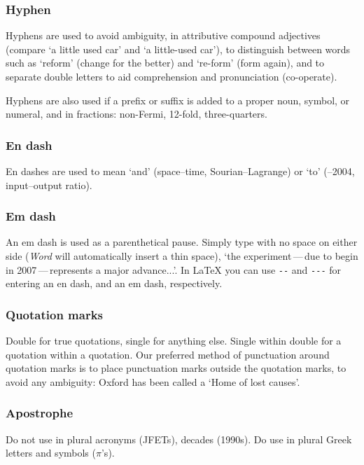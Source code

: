 \documentclass{cernrep}
\begin{document}
\subsubsection{Hyphen}

Hyphens are used to avoid ambiguity, \ie in attributive compound
adjectives (compare `a little used car' and `a little-used car'), to
distinguish between words such as `reform' (change for the better) and
`re-form' (form again), and to separate double letters to aid
comprehension and pronunciation (\eg co-operate).

Hyphens are also used if a prefix or suffix is added to a proper noun,
symbol, or numeral, and in fractions: \eg non-Fermi, 12-fold,
three-quarters.

\subsubsection{En dash}

En dashes are used to mean `and' (\eg space--time, Sourian--Lagrange)
or `to' (--2004, input--output ratio).

\subsubsection{Em dash}

An em dash is used as a parenthetical pause. Simply type with no space
on either side (\emph{Word} will automatically insert a thin space),
\eg `the experiment\,---\,due to begin in 2007\,---\,represents a
major advance...'. In \LaTeX{} you can use \texttt{{-}{-}} and
\texttt{{-}{-}{-}} for entering an en dash, and an em dash,
respectively.

\subsubsection{Quotation marks}

Double for true quotations, single for anything else. Single within
double for a quotation within a quotation. Our preferred method of
punctuation around quotation marks is to place punctuation marks
outside the quotation marks, to avoid any ambiguity: Oxford has been
called a `Home of lost causes'.


\subsubsection{Apostrophe}

Do not use in plural acronyms (\eg JFETs), decades (1990s).  Do use
in plural Greek letters and symbols (\eg $\pi$'s).
\end{document}
